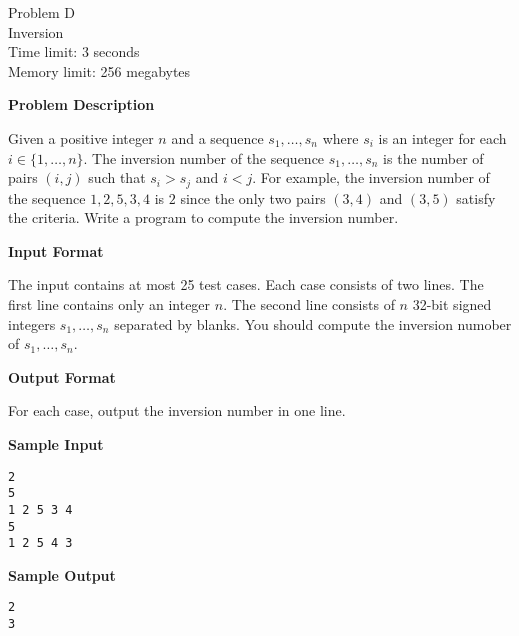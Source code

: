 \documentclass[11pt]{article}
\begin{document}
\begin{center}
    {\LARGE Problem D}\\
    {\Large Inversion}\\
    {Time limit: 3 seconds}\\
    {Memory limit: 256 megabytes}
\end{center}

\textbf{\large Problem Description}

Given a positive integer $n$ and a sequence $s_1,\dots,s_n$ where $s_i$ is an
integer for each $i\in\{1,\dots,n\}$.
The inversion number of the sequence $s_1,\dots,s_n$ is the number of pairs
$(i,j)$ such that $s_i>s_j$ and $i<j$. For example, the inversion number of
the sequence $1,2,5,3,4$ is $2$ since the only two pairs $(3,4)$ and $(3,5)$
satisfy the criteria. Write a program to compute the inversion number.

\textbf{\large Input Format}

The input contains at most 25 test cases. 
Each case consists of two lines. The first line contains only an integer $n$. 
The second line consists of $n$ 32-bit signed integers 
$s_1,\dots,s_n$ separated by blanks.
You should compute the inversion numober of $s_1,\dots,s_n$.

\textbf{\large Output Format}

For each case, output the inversion number in one line.

\textbf{\large Sample Input}

\begin{verbatim}
2
5
1 2 5 3 4
5
1 2 5 4 3
\end{verbatim}

\textbf{\large Sample Output}
\begin{verbatim}
2
3
\end{verbatim}
\end{document}
